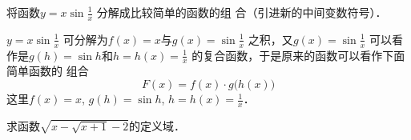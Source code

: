 \begin{example}
    将函数$y=x\sin\frac{1}{x}$
分解成比较简单的函数的组
合（引进新的中间变数符号）．
\end{example}

\begin{solution}
    $y=x\sin\frac{1}{x}$
    可分解为$f(x)=x$与$g(x)=\sin\frac{1}{x}$
    之积，又$g(x)=\sin\frac{1}{x}$
    可以看作是$g(h)=\sin h$和$h=h(x)=\frac{1}{x}$
    的复合函数，于是原来的函数可以看作下面简单函数的
    组合
    \[F(x)=f(x)\cdot g\big(h(x)\big)\]
    这里$f(x)=x$, $g(h)=\sin h$, $h=h(x)=\frac{1}{x}$．    
\end{solution}

\begin{example}
求函数$\sqrt{x-\sqrt{x+1}-2}$的定义域．
\end{example}

